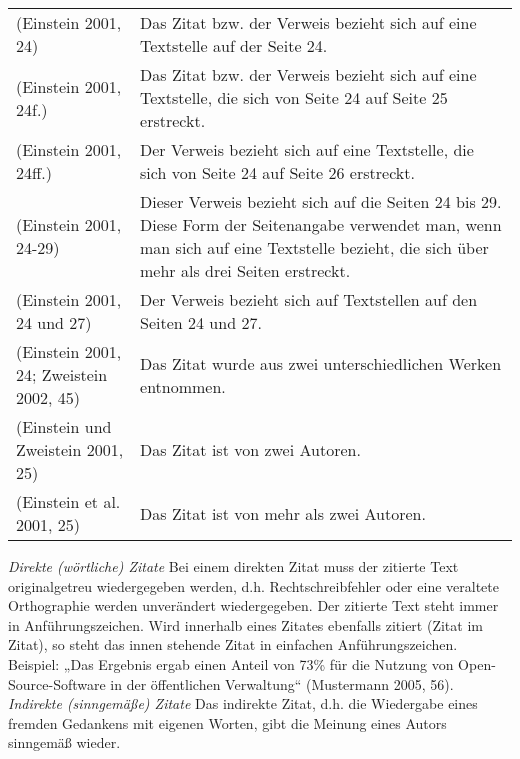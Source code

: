 \documentclass[12pt, oneside]{article}
\begin{document}
\begin{table}[ht]
\centering
\def\arraystretch{1.5}%
\begin{tabular}{l p{8.5cm}} 
    (Einstein 2001, 24) & Das Zitat bzw. der Verweis bezieht sich auf eine Textstelle auf der Seite 24. \\ 
    (Einstein 2001, 24f.) & Das Zitat bzw. der Verweis bezieht sich auf eine Textstelle, die sich von Seite 24 auf Seite 25 erstreckt.\\ 
    (Einstein 2001, 24ff.) & Der Verweis bezieht sich auf eine Textstelle, die sich von Seite 24 auf Seite 26 erstreckt.\\ 
    (Einstein 2001, 24-29) & Dieser Verweis bezieht sich auf die Seiten 24 bis 29. Diese Form der Seitenangabe verwendet man, wenn man sich auf eine Textstelle bezieht, die sich über mehr als drei Seiten erstreckt.\\ 
    (Einstein 2001, 24 und 27) & Der Verweis bezieht sich auf Textstellen auf den Seiten 24 und 27.\\ 
    (Einstein 2001, 24; Zweistein 2002, 45) & Das Zitat wurde aus zwei unterschiedlichen Werken entnommen.\\ 
    (Einstein und Zweistein 2001, 25) & Das Zitat ist von zwei Autoren. \\ 
    (Einstein et al. 2001, 25) & Das Zitat ist von mehr als zwei Autoren. \\ 

\end{tabular}
\end{table}
\bigskip
\noindent
\textit{Direkte (wörtliche) Zitate}
\vspace{1.5mm}
\newline
Bei einem direkten Zitat muss der zitierte Text originalgetreu wiedergegeben werden, d.h. Rechtschreibfehler oder eine veraltete Orthographie werden unverändert wiedergegeben. Der zitierte Text steht immer in Anführungszeichen. Wird innerhalb eines Zitates ebenfalls zitiert (Zitat im Zitat), so steht das innen stehende Zitat in einfachen Anführungszeichen.
Beispiel: „Das Ergebnis ergab einen Anteil von 73\% für die Nutzung von Open-Source-Software in der öffentlichen Verwaltung“ (Mustermann 2005, 56).
\vspace{3mm}
\newline
\textit{Indirekte (sinngemäße) Zitate}
\vspace{1.5mm}
\newline
Das indirekte Zitat, d.h. die Wiedergabe eines fremden Gedankens mit eigenen Worten, gibt die Meinung eines Autors sinngemäß wieder.
\end{document}
